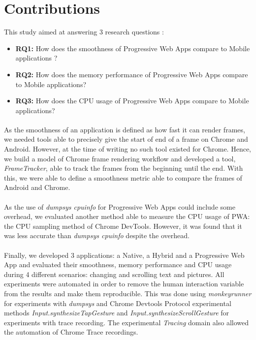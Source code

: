 \documentclass{kththesis}
\begin{document}
\section{Contributions}

This study aimed at answering 3 research questions : 
\begin{itemize}
    \item \textbf{RQ1:} How does the smoothness of Progressive Web Apps compare to Mobile applications ? 
    
    \item \textbf{RQ2:} How does the memory performance of Progressive Web Apps compare to Mobile applications? 
    \item \textbf{RQ3:} How does the CPU usage of Progressive Web Apps compare to Mobile applications?
\end{itemize}


\paragraph{}
As the smoothness of an application is defined as how fast it can render frames, we needed tools able to precisely give the start of end of a frame on Chrome and Android. However, at the time of writing no such tool existed for Chrome. Hence, we build a model of Chrome frame rendering workflow and developed a tool, \textit{FrameTracker}, able to track the frames from the beginning until the end. With this, we were able to define a smoothness metric able to compare the frames of Android and Chrome.

\paragraph{}
As the use of \textit{dumpsys cpuinfo} for Progressive Web Apps could include some overhead, we evaluated another method able to measure the CPU usage of PWA: the CPU sampling method of Chrome DevTools. However, it was found that it was less accurate than \textit{dumpsys cpuinfo} despite the overhead.

\paragraph{}
Finally, we developed 3 applications: a Native, a Hybrid and a Progressive Web App and evaluated their smoothness, memory performance and CPU usage during 4 different scenarios: changing and scrolling text and pictures. \newline
All experiments were automated in order to remove the human interaction variable from the results and make them reproducible. This was done using \textit{monkeyrunner} for experiments with \textit{dumpsys} and Chrome Devtools Protocol experimental methods \textit{Input.synthesizeTapGesture} and \textit{Input.synthesizeScrollGesture} for experiments with trace recording. The experimental \textit{Tracing} domain also allowed the automation of Chrome Trace recordings.
\end{document}

